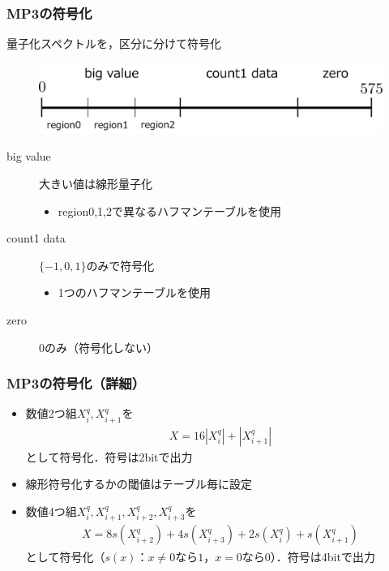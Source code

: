 \documentclass[14pt,xcolor=dvipsnames,table,dvipdfmx]{beamer}
\begin{document}
\begin{frame}[c]
    \frametitle{MP3の符号化}
    量子化スペクトルを，区分に分けて符号化
    \begin{figure}
        \includegraphics[width=115mm]{./figs/huffman_coding_region_division.png}
    \end{figure}
    \begin{description}
        \item[big value] 大きい値は線形量子化
            \begin{itemize}
                \item region0,1,2で異なるハフマンテーブルを使用
            \end{itemize}
        \item[count1 data] $\{ -1, 0, 1 \}$のみで符号化
            \begin{itemize}
                \item 1つのハフマンテーブルを使用
            \end{itemize}
        \item[zero] $0$のみ（符号化しない）
    \end{description}
\end{frame}

\begin{frame}[c]
    \frametitle{MP3の符号化（詳細）}
    \begin{itemize}
        \item 数値2つ組$X_{i}^{q}, X_{i+1}^{q}$を
            \begin{align}
                X = 16 |X_{i}^{q}| + |X_{i+1}^{q}|
            \end{align}
            として符号化．符号は2bitで出力
        \item 線形符号化するかの閾値はテーブル毎に設定
    \end{itemize}
    \begin{itemize}
        \item 数値4つ組$X_{i}^{q}, X_{i+1}^{q}, X_{i+2}^{q}, X_{i+3}^{q}$を
            \begin{align}
                X = 8 s(X_{i+2}^{q}) + 4 s(X_{i+3}^{q}) + 2 s(X_{i}^{q}) + s(X_{i+1}^{q})
            \end{align}
            として符号化（$s(x)$：$x\neq 0$なら$1$，$x=0$なら$0$）．符号は4bitで出力
    \end{itemize}
\end{frame}
\end{document}
